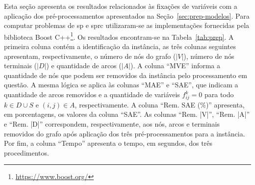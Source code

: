 Esta seção apresenta  os resultados relacionados às fixações de  variáveis com a
aplicação dos  pré-processamentos apresentados  na Seção~\ref{sec:prep-modelos}.
Para computar problemas de \gls{sp} e \gls{sprc} utilizaram-se as implementações
fornecidas pela biblioteca  Boost C++\footnote{\url{https://www.boost.org/}}. Os
resultados  encontram-se na  Tabela~\ref{tab:prep}. A  primeira coluna  contém a
identificação   da   instância,   as    três   colunas   seguintes   apresentam,
respectivamente,  o número  de nós  do grafo  ($|V|$), número  de nós  terminais
($|D|$) e quantidade de arcos ($|A|$).  A coluna ``MVE'' informa a quantidade de
nós que podem ser removidos da  instância pelo processamento em questão. A mesma
lógica se aplica às colunas ``MAE'' e ``SAE'', que indicam a quantidade de arcos
removidos e a quantidade  de variáveis $f_{ij}^{k} = 0$ para todo  $k \in D \cup
S$ e $(i, j) \in A$, respectivamente. A coluna ``Rem. SAE ($\%$)'' apresenta, em
porcentagens,  os valores  da coluna  ``SAE''. As  colunas ``Rem.  |V|'', ``Rem.
|A|'' e ``Rem.  |D|'' correspondem, respectivamente, aos nós,  arcos e terminais
removidos do grafo após aplicação  dos três pré-processamentos para a instância.
Por  fim,  a  coluna  ``Tempo''  apresenta   o  tempo,  em  segundos,  dos  três
procedimentos.
\newpage

